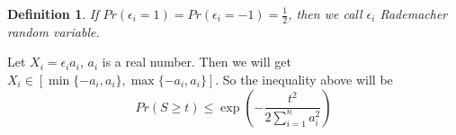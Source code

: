 \documentclass[11pt]{article}
\newtheorem{definition}{Definition}[section]
\begin{document}
\begin{definition}
If $Pr(\epsilon_i = 1) = Pr(\epsilon_i = -1) = \frac{1}{2}$, then we call $\epsilon_i$ Rademacher random variable.
\end{definition}

Let $X_i = \epsilon_i a_i$, $a_i$ is a real number. Then we will get $X_i \in [\min\{-a_i, a_i\}, \max\{-a_i, a_i\}]$. So the inequality above will be 
\[
Pr(S \geq t) \leq \exp(-\frac{t^2}{2\sum_{i=1}^n a_i^2})
\]
\end{document}
